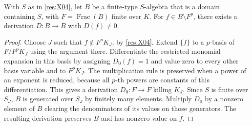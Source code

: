 \begin{lemma}\label{res:X05}
With \(S\) as in \ref{res:X04}, let \(B\) be a finite-type \(S\)-algebra that is a domain containing \(S\), with \(F=\operatorname{Frac}(B)\) finite over \(K\). For \(f\in B\setminus F^p\), there exists a derivation \(D:B\to B\) with \(D(f)\ne0\).
\end{lemma}
\begin{proof}
Choose \(J\) such that \(f\notin F^p K_J\), by \ref{res:X04}. Extend \(\{f\}\) to a \(p\)-basis of \(F/F^pK_J\) using the argument there. Differentiate the restricted monomial expansion in this basis by assigning \(D_0(f)=1\) and value zero to every other basis variable and to \(F^p K_J\). The multiplication rule is preserved when a power of an exponent is reduced, because all \(p\)-th powers are constants of this differentiation. This gives a derivation \(D_0:F\to F\) killing \(K_J\). Since \(S\) is finite over \(S_J\), \(B\) is generated over \(S_J\) by finitely many elements. Multiply \(D_0\) by a nonzero element of \(B\) clearing the denominators of its values on those generators. The resulting derivation preserves \(B\) and has nonzero value on \(f\).
\end{proof}

